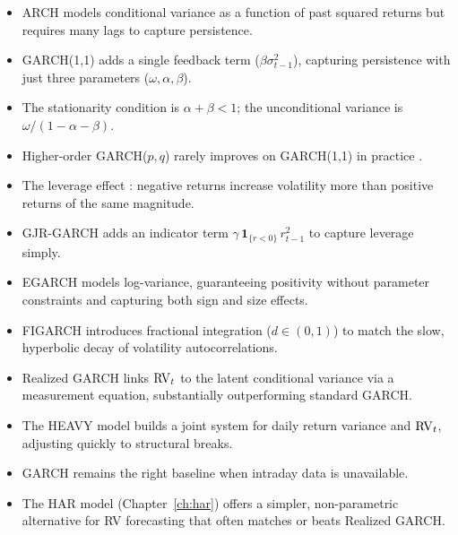 \begin{itemize}[nosep]
  \item ARCH \citep{Engle1982} models conditional variance as a function of past
        squared returns but requires many lags to capture persistence.

  \item GARCH(1,1) \citep{bollerslev1986} adds a single feedback term
        ($\beta \sigma^2_{t-1}$), capturing persistence with just three parameters
        ($\omega, \alpha, \beta$).

  \item The stationarity condition is $\alpha + \beta < 1$; the unconditional
        variance is $\omega / (1 - \alpha - \beta)$.

  \item Higher-order GARCH($p,q$) rarely improves on GARCH(1,1) in practice
        \citep{hansen2005forecast}.

  \item The leverage effect \citep{Black1976}: negative returns increase volatility
        more than positive returns of the same magnitude.

  \item GJR-GARCH \citep{gjr1993} adds an indicator term
        $\gamma \, \mathbf{1}_{\{r<0\}} \, r^2_{t-1}$ to capture leverage simply.

  \item EGARCH \citep{nelson1991} models log-variance, guaranteeing positivity
        without parameter constraints and capturing both sign and size effects.

  \item FIGARCH \citep{baillie1996} introduces fractional integration ($d \in (0,1)$)
        to match the slow, hyperbolic decay of volatility autocorrelations.

  \item Realized GARCH \citep{hansen2012realized} links $\operatorname{RV}_t$ to the latent
        conditional variance via a measurement equation, substantially outperforming
        standard GARCH.

  \item The HEAVY model \citep{shephard2010heavy} builds a joint system for daily
        return variance and $\operatorname{RV}_t$, adjusting quickly to structural breaks.

  \item GARCH remains the right baseline when intraday data is unavailable.

  \item The HAR model (Chapter~\ref{ch:har}) offers a simpler, non-parametric
        alternative for RV forecasting that often matches or beats Realized GARCH.
\end{itemize}


